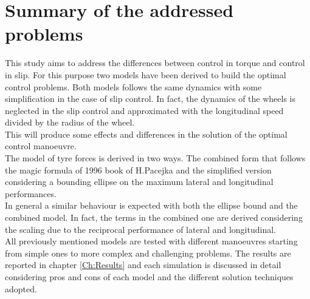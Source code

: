 \section{Summary of the addressed problems}
%
This study aims to address the differences between control in torque and control in slip. For this purpose two models have been derived to build the optimal control problems. Both models follows the same dynamics with some simplification in the case of slip control. In fact, the dynamics of the wheels is neglected in the slip control and approximated with the longitudinal speed divided by the radius of the wheel.\\
This will produce some effects and differences in the solution of the optimal control manoeuvre.\\
The model of tyre forces is derived in two ways. The combined form that follows the magic formula of 1996 book of H.Pacejka\cite{pacejka2006tyre} and the simplified version considering a bounding ellipse on the maximum lateral and longitudinal performances.\\
In general a similar behaviour is expected with both the ellipse bound and the combined model. In fact, the terms in the combined one are derived considering the scaling due to the reciprocal performance of lateral and longitudinal.\\
All previously mentioned models are tested with different manoeuvres starting from simple ones to more complex and challenging problems. The results are reported in chapter \ref{Ch:Results} and each simulation is discussed in detail considering pros and cons of each model and the different solution techniques adopted.
%